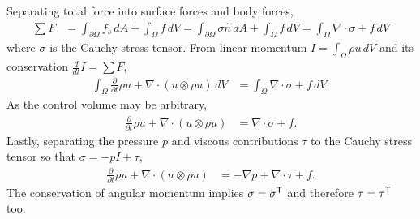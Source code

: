 Separating total force into surface forces and body forces,
\begin{align}
  \sum{}F
  &=
     \int_{\partial\!\Omega} f_s \, dA
   + \int_{\Omega} f \, dV
  =
     \int_{\partial\!\Omega} \sigma \hat{n} \, dA
  +  \int_{\Omega} f \, dV
  =  \int_{\Omega} \nabla\cdot\sigma + f \, dV
\end{align}
where $\sigma$ is the Cauchy stress tensor.  From linear momentum
$I=\int_{\Omega} \rho{}u\,dV$ and its conservation $\frac{d}{dt}I=\sum{}F$,
\begin{align}
    \int_{\Omega}\frac{\partial\!}{\partial\!t}\rho{}u
  + \nabla\cdot(u\otimes{}\rho{}u)\,dV
&= \int_{\Omega} \nabla\cdot\sigma + f \, dV
.
\end{align}
As the control volume may be arbitrary,
\begin{align}
  \frac{\partial\!}{\partial\!t}\rho{}u + \nabla\cdot(u\otimes{}\rho{}u)
&= \nabla\cdot\sigma + f
.
\end{align}
Lastly, separating the pressure $p$ and viscous contributions $\tau$ to
the Cauchy stress tensor so that $\sigma = -p I + \tau$,
\begin{align}
\label{eq:cons_momentum}
\frac{\partial\!}{\partial\!t}\rho{}u + \nabla\cdot(u\otimes{}\rho{}u)
&= -\nabla{}p + \nabla\cdot{}\tau + f
.
\end{align}
The conservation of angular momentum implies $\sigma={\sigma}^{\mathsf{T}}$ and
therefore $\tau={\tau}^{\mathsf{T}}$ too.

